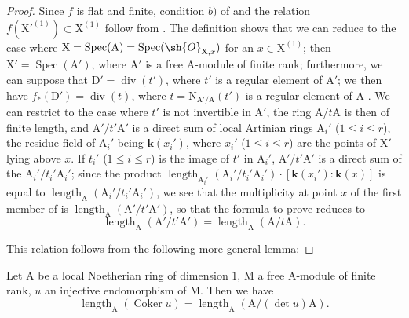 \begin{proof}
Since $f$ is flat and finite, condition $b)$ of  and the relation $f(\mathrm{X}'^{(1)})\subset\mathrm{X}^{(1)}$ follow from .
The definition  shows that we can reduce to the case where $\mathrm{X}=\operatorname{Spec}(\mathrm{A})=\operatorname{Spec}(\sh{O}_{\mathrm{X},x})$ for an $x\in\mathrm{X}^{(1)}$; then $\mathrm{X}'=\operatorname{Spec}(\mathrm{A}')$, where $\mathrm{A}'$ is a free A-module of finite rank; furthermore, we can suppose that $\mathrm{D}'=\operatorname{div}(t')$, where $t'$ is a regular element of $\mathrm{A}'$; we then have $f_*(\mathrm{D}')=\operatorname{div}(t)$, where $t=\mathrm{N}_{\mathrm{A}'/\mathrm{A}}(t')$ is a regular element of $\mathrm{A}$ .
We can restrict to the case where $t'$ is not invertible in $\mathrm{A}'$, the ring $\mathrm{A}/t\mathrm{A}$ is then of finite length, and $\mathrm{A}'/t'\mathrm{A}'$ is a direct sum of local Artinian rings $\mathrm{A}_i'$ ($1\leq i\leq r$), the residue field of $\mathrm{A}_i'$ being $\boldsymbol{k}(x_i')$, where $x_i'$ ($1\leq i\leq r$) are the points of $\mathrm{X}'$ lying above $x$.
If $t_i'$ ($1\leq i\leq r$) is the image of $t'$ in $\mathrm{A}_i'$, $\mathrm{A}'/t'\mathrm{A}'$ is a direct sum of the $\mathrm{A}_i'/t_i'\mathrm{A}_i'$; since the product $\operatorname{length}_{\mathrm{A}_i'}(\mathrm{A}_i'/t_i'\mathrm{A}_i')\cdot[\boldsymbol{k}(x_i'):\boldsymbol{k}(x)]$ is equal to $\operatorname{length}_{\mathrm{A}}(\mathrm{A}_i'/t_i'\mathrm{A}_i')$, we see that the multiplicity at point $x$ of the first member of  is $\operatorname{length}_{\mathrm{A}}(\mathrm{A}'/t'\mathrm{A}')$, so that the formula to prove reduces to
\[
\label{IV.21.10.17.2}
  \operatorname{length}_{\mathrm{A}}(\mathrm{A}'/t'\mathrm{A}')=\operatorname{length}_{\mathrm{A}}(\mathrm{A}/t\mathrm{A}).
  \tag{21.10.17.2}
\]

This relation follows from the following more general lemma:
\end{proof}

\begin{lemma}[21.10.17.3]
\label{IV.21.10.17.3}
Let $\mathrm{A}$ be a local Noetherian ring of dimension $1$, $\mathrm{M}$ a free A-module of finite rank, $u$ an injective endomorphism of $\mathrm{M}$.
Then we have
\[
\label{IV.21.10.17.4}
  \operatorname{length}_{\mathrm{A}}(\operatorname{Coker} u)=\operatorname{length}_{\mathrm{A}}(\mathrm{A}/(\det u)\mathrm{A}).
  \tag{21.10.17.4}
\]
\end{lemma}

